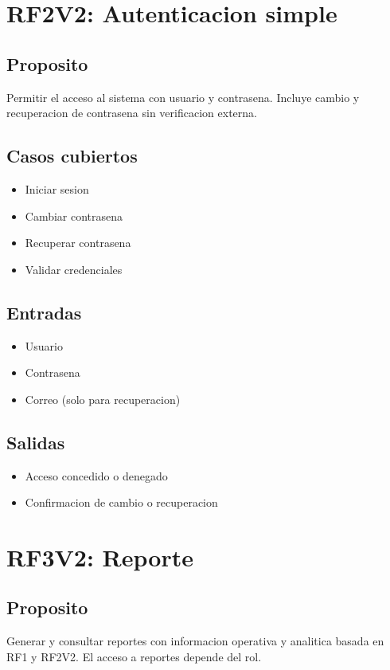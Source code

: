 \documentclass[12pt]{article}
\begin{document}
\section{RF2V2: Autenticacion simple}
\subsection{Proposito}
Permitir el acceso al sistema con usuario y contrasena. Incluye cambio y recuperacion de contrasena sin verificacion externa.

\subsection{Casos cubiertos}
\begin{itemize}
  \item Iniciar sesion
  \item Cambiar contrasena
  \item Recuperar contrasena
  \item Validar credenciales
\end{itemize}

\subsection{Entradas}
\begin{itemize}
  \item Usuario
  \item Contrasena
  \item Correo (solo para recuperacion)
\end{itemize}

\subsection{Salidas}
\begin{itemize}
  \item Acceso concedido o denegado
  \item Confirmacion de cambio o recuperacion
\end{itemize}

\section{RF3V2: Reporte}
\subsection{Proposito}
Generar y consultar reportes con informacion operativa y analitica basada en RF1 y RF2V2. El acceso a reportes depende del rol.
\end{document}
